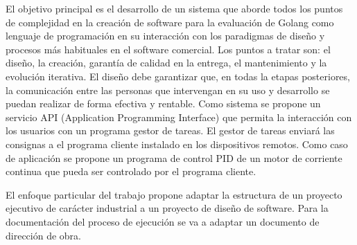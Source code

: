 
El objetivo principal es el desarrollo de un sistema que aborde todos los puntos de complejidad en la creación de software para la evaluación de Golang como lenguaje de programación en su interacción con los paradigmas de diseño y procesos más habituales en el software comercial.
Los puntos a tratar son: el diseño, la creación, garantía de calidad en la entrega, el mantenimiento y la evolución iterativa.
El diseño debe garantizar que, en todas la etapas posteriores, la comunicación entre las personas que intervengan en su uso y desarrollo se puedan realizar de forma efectiva y rentable.
Como sistema se propone un servicio \gls{API} (Application Programming Interface) que permita la interacción con los usuarios con un programa gestor de tareas.
El gestor de tareas enviará las consignas a el programa cliente instalado en los dispositivos remotos.
Como caso de aplicación se propone un programa de control PID de un motor de corriente continua que pueda ser controlado por el programa cliente.

El enfoque particular del trabajo propone adaptar la estructura de un proyecto ejecutivo de carácter industrial a un proyecto de diseño de software.
Para la documentación del proceso de ejecución se va a adaptar un documento de dirección de obra.

